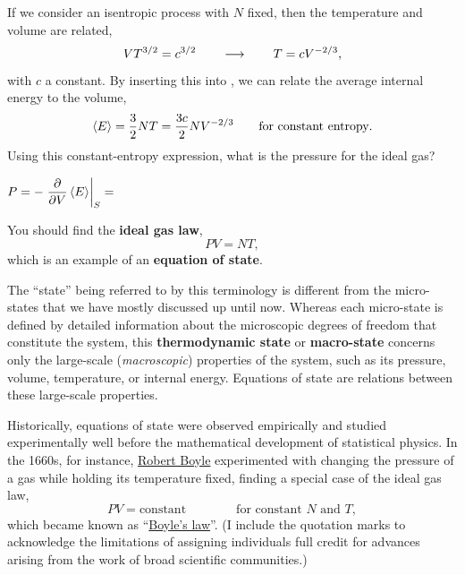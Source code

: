 If we consider an isentropic process with $N$ fixed, then the temperature and volume are related,
\begin{equation*}
  V T^{3/2} = c^{3/2} \qquad \longrightarrow \qquad T = c V^{-2 / 3},
\end{equation*}
with $c$ a constant.
By inserting this into , we can relate the average internal energy to the volume,
\begin{equation*}
  \left\langle E \right\rangle = \frac{3}{2} NT = \frac{3c}{2} N V^{-2 / 3} \qquad \mbox{for constant entropy}.
\end{equation*}
Using this constant-entropy expression, what is the pressure for the ideal gas?
\begin{mdframed}
  $\displaystyle P = -\left. \frac{\partial }{\partial V} \left\langle E \right\rangle\right|_S = $ \\[100 pt]
\end{mdframed}

\begin{shaded}
  You should find the \textbf{ideal gas law},
  \begin{equation}
    \label{eq:ideal_gas_law}
    PV = NT,
  \end{equation}
  which is an example of an \textbf{equation of state}.
\end{shaded}

The ``state'' being referred to by this terminology is different from the micro-states that we have mostly discussed up until now.
Whereas each micro-state is defined by detailed information about the microscopic degrees of freedom that constitute the system, this \textbf{thermodynamic state} or \textbf{macro-state} concerns only the large-scale (\textit{macroscopic}) properties of the system, such as its pressure, volume, temperature, or internal energy.
Equations of state are relations between these large-scale properties.

Historically, equations of state were observed empirically and studied experimentally well before the mathematical development of statistical physics.
In the 1660s, for instance, \href{https://en.wikipedia.org/wiki/Robert_Boyle}{Robert Boyle} experimented with changing the pressure of a gas while holding its temperature fixed, finding a special case of the ideal gas law,
\begin{equation*}
  PV = \mbox{constant} \qquad\qquad \mbox{for constant } N \mbox{ and } T,
\end{equation*}
which became known as ``\href{https://en.wikipedia.org/wiki/Boyle's_law}{Boyle's law}''.
(I include the quotation marks to acknowledge the limitations of assigning individuals full credit for advances arising from the work of broad scientific communities.)

